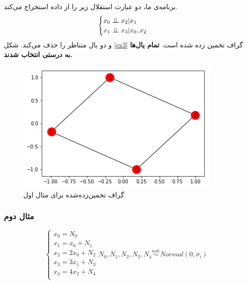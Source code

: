 \documentclass{article}
\begin{document}
برنامه‌ی ما، دو عبارت استقلال زیر را از داده استخراج می‌کند.
\begin{equation}
\begin{cases}
x_0 \bigCI x_2 | x_1\\
x_1 \bigCI x_3 | x_0, x_2\\
\end{cases}
\end{equation}
و دو یال متناظر را حذف می‌کند. 
شکل
\eqref{ex3}
گراف تخمین زده شده است. 
\textbf{تمام یال‌ها به درستی انتخاب شدند.}

\begin{figure}[h]
	\centering
		\includegraphics[scale=0.5]{pcex1.png}
	\caption{گراف تخمین‌زده‌شده برای مثال اول}
	\label{ex3}
\end{figure}
\subsubsection{مثال دوم}
\begin{equation}
\begin{cases}
x_0 = N_0\\
x_1 =  x_0 + N_1\\
x_2 =  2x_0 + N_2\\
x_3 =  3x_1 + N_3\\
x_4 =  4x_2 + N_4\\

\end{cases}
N_0, N_1, N_2, N_3, N_4 \stackrel{ind.}{\sim} Normal(0,\sigma_i)
\end{equation}
\end{document}
